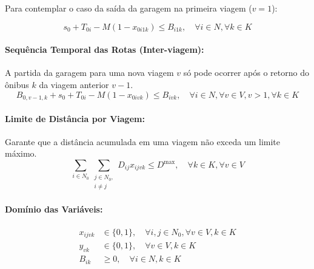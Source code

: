 \documentclass[12pt, a4paper]{article}
\begin{document}
\noindent Para contemplar o caso da saída da garagem na primeira viagem ($v=1$):

\begin{equation}
    s_0 + T_{0i} - M(1 - x_{0i1k}) \le B_{i1k}, \quad \forall i \in N, \forall k \in K
\end{equation}

\paragraph{Sequência Temporal das Rotas (Inter-viagem):} A partida da garagem para uma nova viagem $v$ só pode ocorrer após o retorno do ônibus $k$ da viagem anterior $v-1$.
\begin{equation}
    B_{0,v-1,k} + s_0 + T_{0i} - M(1 - x_{0ivk}) \le B_{ivk}, \quad \forall i \in N, \forall v \in V, v > 1, \forall k \in K
\end{equation}

\paragraph{Limite de Distância por Viagem:} Garante que a distância acumulada em uma viagem não exceda um limite máximo.
\begin{equation}
\sum_{i \in N_0} \sum_{\substack{j \in N_0,\\i \neq j}} D_{ij} x_{ijvk} \le D^{\max}, \quad \forall k \in K, \forall v \in V
\end{equation}

\paragraph{Domínio das Variáveis:}
\begin{align}
x_{ijvk} &\in \{0, 1\}, \quad \forall i,j \in N_0, \forall v \in V, k \in K \\
y_{vk} &\in \{0, 1\}, \quad \forall v \in V, k \in K \\
B_{ik} &\ge 0, \quad \forall i \in N, k \in K
\end{align}

% 
% 
\end{document}
